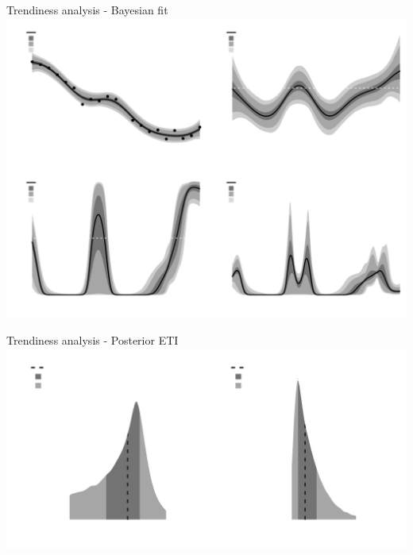 \documentclass[ignorenonframetext,xcolor=pdflatex,table,dvipsnames,serif]{beamer}
\begin{document}
\begin{frame}{Trendiness analysis - Bayesian fit}
\center\includegraphics[scale=0.47]{fitBayes}	
\end{frame}

\begin{frame}{Trendiness analysis - Posterior ETI}
\center\includegraphics[scale=0.5]{ETIplot}	
\end{frame}
\end{document}
